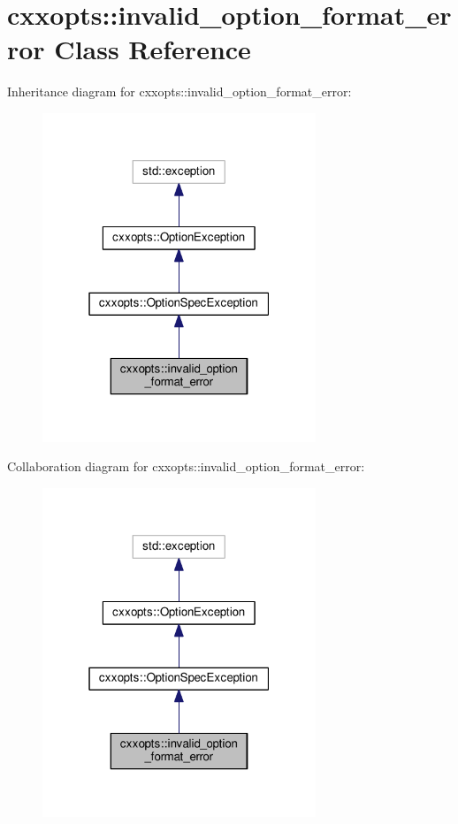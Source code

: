 \hypertarget{classcxxopts_1_1invalid__option__format__error}{}\section{cxxopts\+:\+:invalid\+\_\+option\+\_\+format\+\_\+error Class Reference}
\label{classcxxopts_1_1invalid__option__format__error}


Inheritance diagram for cxxopts\+:\+:invalid\+\_\+option\+\_\+format\+\_\+error\+:
\nopagebreak
\begin{figure}[H]
\begin{center}
\leavevmode
\includegraphics[width=232pt]{classcxxopts_1_1invalid__option__format__error__inherit__graph}
\end{center}
\end{figure}


Collaboration diagram for cxxopts\+:\+:invalid\+\_\+option\+\_\+format\+\_\+error\+:
\nopagebreak
\begin{figure}[H]
\begin{center}
\leavevmode
\includegraphics[width=232pt]{classcxxopts_1_1invalid__option__format__error__coll__graph}
\end{center}
\end{figure}
